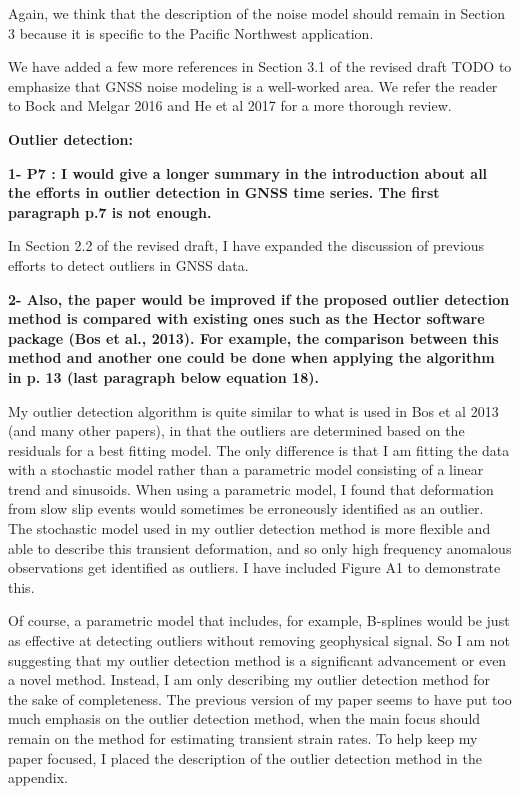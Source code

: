 \documentclass[10pt,a4paper]{letter}
\begin{document}
\begin{letter}{}
Again, we think that the description of the noise model should remain
in Section 3 because it is specific to the Pacific Northwest
application. 

We have added a few more references in Section 3.1 of the revised
draft TODO to emphasize that GNSS noise modeling is a well-worked
area. We refer the reader to Bock and Melgar 2016 and He et al 2017
for a more thorough review.

\textbf{Outlier detection:}

\textbf{1- P7 : I would give a longer summary in the introduction about all
the efforts in outlier detection in GNSS time series. The first
paragraph p.7 is not enough.}

In Section 2.2 of the revised draft, I have expanded the discussion of
previous efforts to detect outliers in GNSS data.

\textbf{2- Also, the paper would be improved if the proposed outlier detection
method is compared with existing ones such as the Hector software
package (Bos et al., 2013). For example, the comparison between this
method and another one could be done when applying the algorithm in p.
13 (last paragraph below equation 18).}

My outlier detection algorithm is quite similar to what is used in Bos
et al 2013 (and many other papers), in that the outliers are
determined based on the residuals for a best fitting model. The only
difference is that I am fitting the data with a stochastic model
rather than a parametric model consisting of a linear trend and
sinusoids. When using a parametric model, I found that deformation
from slow slip events would sometimes be erroneously identified as an
outlier. The stochastic model used in my outlier detection method is
more flexible and able to describe this transient deformation, and so
only high frequency anomalous observations get identified as outliers.
I have included Figure A1 to demonstrate this.

Of course, a parametric model that includes, for example, B-splines
would be just as effective at detecting outliers without removing
geophysical signal. So I am not suggesting that my outlier detection
method is a significant advancement or even a novel method. Instead, I
am only describing my outlier detection method for the sake of
completeness. The previous version of my paper seems to have put too
much emphasis on the outlier detection method, when the main focus
should remain on the method for estimating transient strain rates. To
help keep my paper focused, I placed the description of the outlier
detection method in the appendix.


\end{letter}
\end{document}

